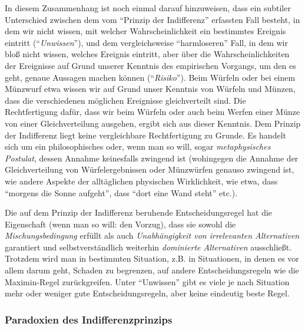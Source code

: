 In diesem Zusammenhang ist noch einmal darauf hinzuweisen, dass ein subtiler
Unterschied zwischen dem vom "`Prinzip der Indifferenz"' erfassten Fall besteht,
in dem wir nicht wissen, mit welcher Wahrscheinlichkeit ein bestimmtes Ereignis
eintritt ("`{\em Unwissen}"'), und dem vergleichsweise "`harmloseren"' Fall, in
dem wir bloß nicht wissen, welches Ereignis eintritt, aber über die
Wahrscheinlichkeiten der Ereignisse auf Grund unserer Kenntnis des empirischen
Vorgangs, um den es geht, genaue Aussagen machen können ("`{\em Risiko}"'). Beim
Würfeln oder bei einem Münzwurf etwa wissen wir auf Grund unser Kenntnis von
Würfeln und Münzen, dass die verschiedenen möglichen Ereignisse gleichverteilt
sind. Die Rechtfertigung dafür, dass wir beim Würfeln oder auch beim Werfen einer
Münze von einer Gleichverteilung ausgehen, ergibt sich aus dieser Kenntnis. Dem
Prinzip der Indifferenz liegt keine vergleichbare Rechtfertigung zu Grunde. Es
handelt sich um ein philosophisches oder, wenn man so will, sogar {\em
metaphysisches Postulat}, dessen Annahme keinesfalls zwingend ist (wohingegen die
Annahme der Gleichverteilung von Würfelergebnissen oder Münzwürfen genauso
zwingend ist, wie andere Aspekte der alltäglichen physischen Wirklichkeit, wie
etwa, dass "`morgens die Sonne aufgeht"', dass "`dort eine Wand steht"' etc.).

Die auf dem Prinzip der Indifferenz beruhende Entscheidungsregel hat die
Eigenschaft (wenn man so will: den Vorzug), dass sie sowohl die {\em
Mischungsbedingung} erfüllt als auch {\em Unabhängigkeit von irrelevanten
Alternativen} garantiert und selbstverständlich weiterhin {\em dominierte
Alternativen} ausschließt. Trotzdem wird man in bestimmten Situation, z.B. in
Situationen, in denen es vor allem darum geht, Schaden zu begrenzen, auf andere
Entscheidungsregeln wie die Maximin-Regel zurückgreifen. Unter "`Unwissen"' gibt
es viele je nach Situation mehr oder weniger gute Entscheidungsregeln, aber keine
eindeutig beste Regel.

\subsubsection{Paradoxien des Indifferenzprinzips}
\label{IndifferenzPrinzipParadoxien}

